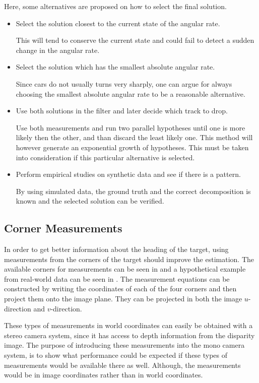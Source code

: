 Here, some alternatives are proposed on how to select the final solution.
%
\begin{itemize}
    \item Select the solution closest to the current state of the angular rate.

    This will tend to conserve the current state and could fail to detect a sudden change in the angular rate.

    \item Select the solution which has the smallest absolute angular rate.

    Since cars do not usually turns very sharply, one can argue for always choosing the smallest absolute angular rate to be a reasonable alternative.

    \item Use both solutions in the filter and later decide which track to drop.

    Use both measurements and run two parallel hypotheses until one is more likely then the other, and than discard the least likely one.
    This method will however generate an exponential growth of hypotheses.
    This must be taken into consideration if this particular alternative is selected.

    \item Perform empirical studies on synthetic data and see if there is a pattern.

    By using simulated data, the ground truth and the correct decomposition is known and the selected solution can be verified.
\end{itemize}

\subsection{Corner Measurements}
In order to get better information about the heading of the target, using measurements from the corners of the target should improve the estimation.
The available corners for measurements can be seen in  and a hypothetical example from real-world data can be seen in .
The measurement equations can be constructed by writing the  coordinates of each of the four corners and then project them onto the image plane.
They can be projected in both the image $u$-direction and $v$-direction.

These types of measurements in world coordinates can easily be obtained with a stereo camera system, since it has access to depth information from the disparity image.
The purpose of introducing these measurements into the mono camera system, is to show what performance could be expected if these types of measurements would be available there as well.
Although, the measurements would be in image coordinates rather than in world coordinates.


